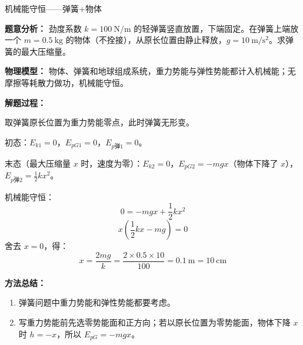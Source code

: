 \begin{examplebox}{机械能守恒——弹簧+物体}

\textbf{题意分析：} 劲度系数 $k = 100\ \mathrm{N/m}$ 的轻弹簧竖直放置，下端固定。在弹簧上端放一个 $m = 0.5\ \mathrm{kg}$ 的物体（不拴接），从原长位置由静止释放，$g = 10\ \mathrm{m/s^2}$。求弹簧的最大压缩量。

\textbf{物理模型：} 物体、弹簧和地球组成系统，重力势能与弹性势能都计入机械能；无摩擦等耗散力做功，机械能守恒。

\begin{center}


\label{fig:spring-compression-energy}
\end{center}

\textbf{解题过程：}

取弹簧原长位置为重力势能零点，此时弹簧无形变。

初态：$E_{k1}=0$，$E_{pG1}=0$，$E_{p\text{弹}1}=0$。

末态（最大压缩量 $x$ 时，速度为零）：$E_{k2}=0$，$E_{pG2} = -mgx$（物体下降了 $x$），$E_{p\text{弹}2} = \frac12 kx^2$。

机械能守恒：
\[
0 = -mgx + \frac12 kx^2
\]
\[
x( \frac12 kx - mg) = 0
\]
舍去 $x=0$，得：
\[
x = \frac{2mg}{k} = \frac{2 \times 0.5 \times 10}{100} = 0.1\ \mathrm{m} = 10\ \mathrm{cm}
\]

\textbf{方法总结：}
\begin{enumerate}
  \item 弹簧问题中重力势能和弹性势能都要考虑。
  \item 写重力势能前先选零势能面和正方向；若以原长位置为零势能面，物体下降 $x$ 时 $h=-x$，所以 $E_{pG}=-mgx$。
\end{enumerate}

\end{examplebox}

